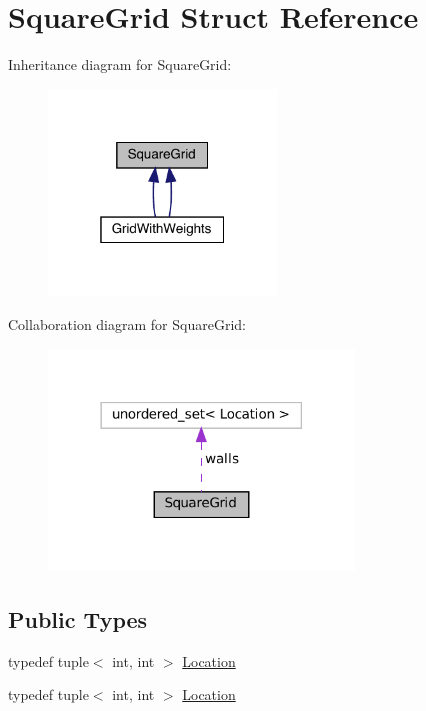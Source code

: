 \hypertarget{struct_square_grid}{}\section{Square\+Grid Struct Reference}
\label{struct_square_grid}


Inheritance diagram for Square\+Grid\+:\nopagebreak
\begin{figure}[H]
\begin{center}
\leavevmode
\includegraphics[width=172pt]{struct_square_grid__inherit__graph}
\end{center}
\end{figure}


Collaboration diagram for Square\+Grid\+:\nopagebreak
\begin{figure}[H]
\begin{center}
\leavevmode
\includegraphics[width=230pt]{struct_square_grid__coll__graph}
\end{center}
\end{figure}
\subsection*{Public Types}
\begin{DoxyCompactItemize}
\item 
typedef tuple$<$ int, int $>$ \mbox{\hyperlink{struct_square_grid_a2c9a2cbd3912aa48ac97289abc3f1c0f}{Location}}
\item 
typedef tuple$<$ int, int $>$ \mbox{\hyperlink{struct_square_grid_a2c9a2cbd3912aa48ac97289abc3f1c0f}{Location}}
\end{DoxyCompactItemize}
